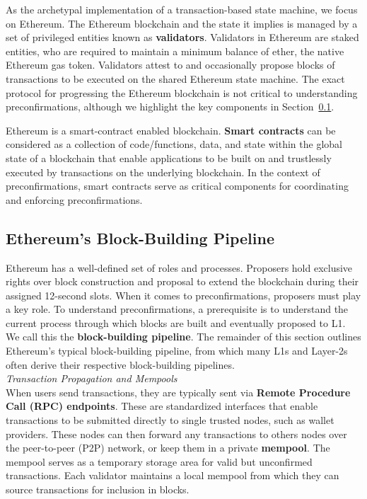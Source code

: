 \documentclass[a4paper]{article}
\theoremstyle{boldstyle}
\begin{document}
    As the archetypal implementation of a transaction-based state machine, we focus on Ethereum.
    The Ethereum blockchain and the state it implies is managed by a set of privileged entities known as \textbf{validators}. Validators in Ethereum are staked entities, who are required to maintain a minimum balance of ether, the native Ethereum gas token. Validators attest to and occasionally propose blocks of transactions to be executed on the shared Ethereum state machine. The exact protocol for progressing the Ethereum blockchain is not critical to understanding preconfirmations, although we highlight the key components in Section~\ref{sec:L1_pipeline}.

    Ethereum is a smart-contract enabled blockchain. \textbf{Smart contracts} can be considered as a collection of code/functions, data, and state within the global state of a blockchain \cite{W:IntroductionToSmartContracts} that enable applications to be built on and trustlessly executed by transactions on the underlying blockchain. In the context of preconfirmations, smart contracts serve as critical components for coordinating and enforcing preconfirmations.
    
    \subsection{Ethereum's Block-Building Pipeline}
    \label{sec:L1_pipeline}
    Ethereum has a well-defined set of roles and processes. Proposers hold exclusive rights over block construction and proposal to extend the blockchain during their assigned 12-second slots. When it comes to preconfirmations, proposers must play a key role. To understand preconfirmations, a prerequisite is to understand the current process through which blocks are built and eventually proposed to L1. We call this the \textbf{block-building pipeline}. The remainder of this section outlines Ethereum's typical block-building pipeline, from which many L1s and Layer-2s often derive their respective block-building pipelines. \\
    
    \textit{Transaction Propagation and Mempools} \\
        When users send transactions, they are typically sent via \textbf{Remote Procedure Call (RPC) endpoints}. These are standardized interfaces that enable transactions to be submitted directly to single trusted nodes, such as wallet providers. These nodes can then forward any transactions to others nodes over the peer-to-peer (P2P) network, or keep them in a private \textbf{mempool}. The mempool serves as a temporary storage area for valid but unconfirmed transactions. Each validator maintains a local mempool from which they can source transactions for inclusion in blocks. \\
\end{document}
